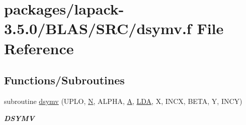 \hypertarget{lapack-3_85_80_2BLAS_2SRC_2dsymv_8f}{}\section{packages/lapack-\/3.5.0/\+B\+L\+A\+S/\+S\+R\+C/dsymv.f File Reference}
\label{lapack-3_85_80_2BLAS_2SRC_2dsymv_8f}
\subsection*{Functions/\+Subroutines}
\begin{DoxyCompactItemize}
\item 
subroutine \hyperlink{group__double__blas__level2_ga6ab49c8fa5e2608d9545483045bf3d03}{dsymv} (U\+P\+L\+O, \hyperlink{polmisc_8c_a0240ac851181b84ac374872dc5434ee4}{N}, A\+L\+P\+H\+A, \hyperlink{classA}{A}, \hyperlink{example__user_8c_ae946da542ce0db94dced19b2ecefd1aa}{L\+D\+A}, X, I\+N\+C\+X, B\+E\+T\+A, Y, I\+N\+C\+Y)
\begin{DoxyCompactList}\small\item\em {\bfseries D\+S\+Y\+M\+V} \end{DoxyCompactList}\end{DoxyCompactItemize}

